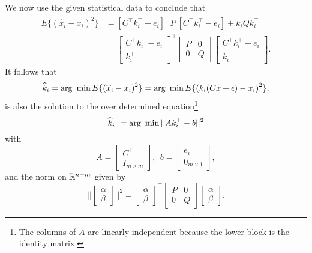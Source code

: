 \documentclass[letterpaper]{article}
\begin{document}
\begin{enumerate}
We now use the given statistical data to conclude that
\begin{align*}
 E\{ \left( \widehat{x}_i - x_i \right)^2 \} &=   [C^\top k_i^\top-e_i]^\top P~ [C^\top k_i^\top-e_i] +  k_i Q k_i^\top \\
 &=\left[ \begin{array}{c} C^\top k_i^\top - e_i \\ k_i^\top\end{array} \right]^\top \left[ \begin{array}{cc}  P & 0  \\ 0& Q \end{array} \right] \left[ \begin{array}{c} C^\top k_i^\top - e_i \\ k_i^\top\end{array} \right].
\end{align*}
It follows that
$$\widehat{k}_i = {\rm arg}~\min  E\{ \left( \widehat{x}_i - x_i \right)^2 \} =\text{arg}~ \min E\{ \left( k_i (Cx+\epsilon)  - x_i \right)^2 \},$$
is also the solution to the over determined equation\footnote{The columns of $A$ are linearly independent because the lower block is the identity matrix.}
$$\widehat{k}_i^\top = {\rm arg}~\min ||A  k_i^\top - b||^2$$
with
$$A=\left[\begin{array}{c}  C^\top \\ I_{m\times m}\end{array} \right],~~b=\left[\begin{array}{c}  e_i \\ 0_{m\times 1}\end{array} \right],$$
and the norm on $\mathbb R^{n+m}$ given by $$||\left[ \begin{array}{c} \alpha \\ \beta\end{array} \right]||^2 = \left[ \begin{array}{c} \alpha \\ \beta\end{array} \right]^\top \left[ \begin{array}{cc}  P & 0  \\ 0& Q \end{array} \right] \left[ \begin{array}{c} \alpha \\ \beta\end{array} \right].$$


\end{enumerate}
\end{document}
